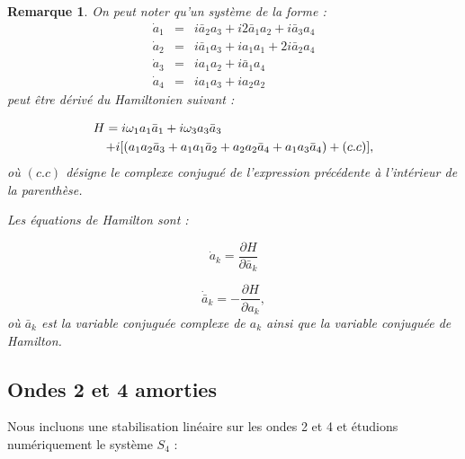 \documentclass{book}
\newtheorem{rem}{Remarque}[chapter]
\begin{document}
\begin{rem}
On peut noter \cite{Zakharov85,Zufiria88} qu'un syst\`eme de la forme :
\begin{eqnarray}
\dot{a}_1&=&i\bar{a}_2{a}_3+i2\bar{a}_1a_2+i\bar{a}_3a_4\\
\dot{a}_2&=&i\bar{a}_1{a}_3+ia_1a_1+2i\bar{a}_2a_4\\
\dot{a}_3&=&ia_1a_2+i\bar{a}_1a_4\\
\dot{a}_4&=&ia_1a_3+ia_2a_2
\end{eqnarray}
peut \^etre d\'eriv\'e du Hamiltonien suivant :

\begin{eqnarray}
\lefteqn{H=i\omega_1a_1\bar{a}_1+i\omega_3a_3\bar{a}_3}\nonumber\\
&&+i[(a_1a_2\bar{a}_3+a_1a_1\bar{a}_2+a_2a_2\bar{a}_4+a_1a_3\bar{a}_4)+(c.c)],
\end{eqnarray}
o\`u $(c.c)$ d\'esigne le complexe conjugu\'e de l'expression
pr\'ec\'edente \`a 
l'int\'erieur de la parenth\`ese.

Les \'equations de Hamilton sont :

\begin{equation}
\dot{a}_k=\frac{\partial H}{\partial \bar{a}_k}
\end{equation}

\begin{equation}
\dot{\bar{a}}_k=-\frac{\partial H}{\partial {a}_k},
\end{equation}
o\`u  $\bar{a}_k$ est la variable conjugu\'ee complexe de $a_k$
ainsi que la variable conjugu\'ee de Hamilton.


\end{rem}

\subsection{Ondes 2 et 4 amorties}
Nous incluons une stabilisation lin\'eaire sur les ondes 2 et 4 et
\'etudions num\'eriquement le syst\`eme $S_4$ :
\end{document}
